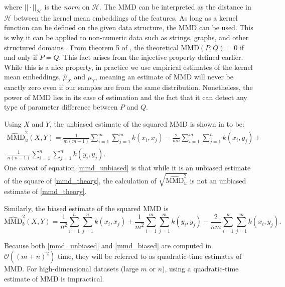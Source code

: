 where $||\cdot||_\mathcal{H}$ is the \textit{norm} on $\mathcal{H}$. The MMD can be interpreted as the distance in $\mathcal{H}$ between the kernel mean embeddings of the features. As long as a kernel function can be defined on the given data structure, the MMD can be used. This is why it can be applied to non-numeric data such as strings, graphs, and other structured domains \cite{hofmann2008kernel}. From theorem 5 of \cite{gretton2012kernel}, the theoretical MMD$(P,Q) = 0$ if and only if $P=Q$. This fact arises from the injective property defined earlier. While this is a nice property, in practice we use empirical estimates of the kernel mean embeddings, $\hat{\mu}_X $ and $\hat{\mu}_Y$, meaning an estimate of MMD will never be exactly zero even if our samples are from the same distribution. Nonetheless, the power of MMD lies in its ease of estimation and the fact that it can detect any type of parameter difference between $P$ and $Q$. 

Using $X$ and $Y$, the unbiased estimate of the squared MMD is shown in \cite{gretton2012kernel} to be:
\begin{equation}
\label{mmd_unbiased}
\begin{split}
\widehat{\text{MMD}}_{u}^{2}(X, Y)=\frac{1}{m(m-1)} \sum_{i=1}^m \sum_{ j=1}^{m} k\left(x_{i}, x_{j}\right)-\frac{2}{m n} \sum_{i=1}^m \sum_{ j=1}^{n} k\left(x_{i}, y_{j}\right)+ \\
\frac{1}{n(n-1)} \sum_{i=1}^n \sum_{j=1}^{n} k\left(y_{i}, y_{j}\right).
\end{split}
\end{equation}
One caveat of equation \ref{mmd_unbiased} is that while it is an unbiased estimate of the square of \ref{mmd_theory}, the calculation of $\sqrt{\widehat{\text{MMD}}_{u}^{2}}$ is not an unbiased estimate of \ref{mmd_theory}.

Similarly, the biased estimate of the squared MMD is
\begin{equation}
\label{mmd_biased}
\widehat{\text{MMD}}_{b}^{2}(X, Y)= \frac{1}{n^{2}} \sum_{i=1}^{n} \sum_{j=1}^{n} k\left(x_{i}, x_{j}\right)+\frac{1}{m^{2}} \sum_{i=1}^{m} \sum_{j=1}^{m} k\left(y_{i}, y_{j}\right)-\frac{2}{n m} \sum_{i=1}^{n} \sum_{j=1}^{m} k\left(x_{i}, y_{j}\right).
\end{equation}

Because both \ref{mmd_unbiased} and \ref{mmd_biased} are computed in $\mathcal{O}((m + n)^2)$ time, they will be referred to as quadratic-time estimates of MMD. For high-dimensional datasets (large $m$ or $n$), using a quadratic-time estimate of MMD is impractical.  


